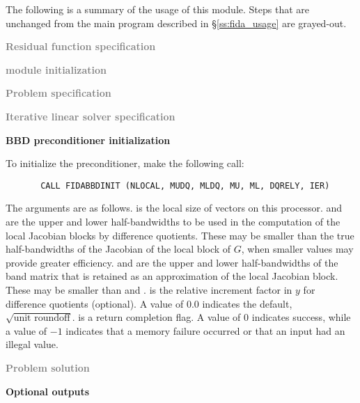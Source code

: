 The following is a summary of the usage of this module. Steps that are unchanged
from the main program described in \S\ref{ss:fida_usage} are grayed-out.

\begin{Steps}
  
\item \textcolor{gray}{\bf Residual function specification}

\item \textcolor{gray}{\bf {\nvector} module initialization}

\item \textcolor{gray}{\bf Problem specification}

\item \textcolor{gray}{\bf Iterative linear solver specification}

\item {\bf BBD preconditioner initialization}

  To initialize the {\idabbdpre} preconditioner, make the following call:
\begin{verbatim}
       CALL FIDABBDINIT (NLOCAL, MUDQ, MLDQ, MU, ML, DQRELY, IER)
\end{verbatim}
  The arguments are as follows.
   is the local size of vectors on this processor.
   and  are the upper and lower half-bandwidths to be used in 
  the computation of the local Jacobian blocks by difference quotients.
  These may be smaller than the true half-bandwidths of the
  Jacobian of the local block of $G$, when smaller values may
  provide greater efficiency.
   and  are the upper and lower half-bandwidths of the band matrix
  that  is retained as an approximation of the local Jacobian block.
  These may be smaller than  and .
   is the relative increment factor in $y$ for difference quotients
  (optional). A value of $0.0$ indicates the default, $\sqrt{\text{unit roundoff}}$.
   is a return completion flag.  A value of $0$ indicates success, while
  a value of $-1$ indicates that a memory failure occurred or that an input had
  an illegal value.

\item \textcolor{gray}{\bf Problem solution}
  
\item {\bf {\idabbdpre} Optional outputs}


\end{Steps}
